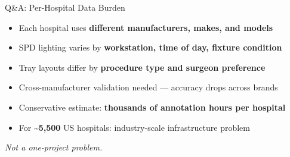 \documentclass[10pt,aspectratio=169]{beamer}
\newcommand{\takeaway}[1]{%
  \vspace{0.25cm}
  \begin{center}\textit{\small #1}\end{center}
}
\begin{document}
\begin{frame}{Q\&A: Per-Hospital Data Burden}
  \vspace{0.2cm}
  \begin{itemize}
    \item[\textbf{--}] Each hospital uses \textbf{different manufacturers, makes, and models}

    \item[\textbf{--}] SPD lighting varies by \textbf{workstation, time of day, fixture condition}

    \item[\textbf{--}] Tray layouts differ by \textbf{procedure type and surgeon preference}

    \item[\textbf{--}] Cross-manufacturer validation needed --- accuracy drops across brands

    \item[\textbf{--}] Conservative estimate: \textbf{thousands of annotation hours per hospital}

    \item[\textbf{--}] For \textbf{\textasciitilde5,500} US hospitals: industry-scale infrastructure problem
  \end{itemize}
  \vspace{0.2cm}
  \takeaway{Not a one-project problem.}
\end{frame}
\end{document}
